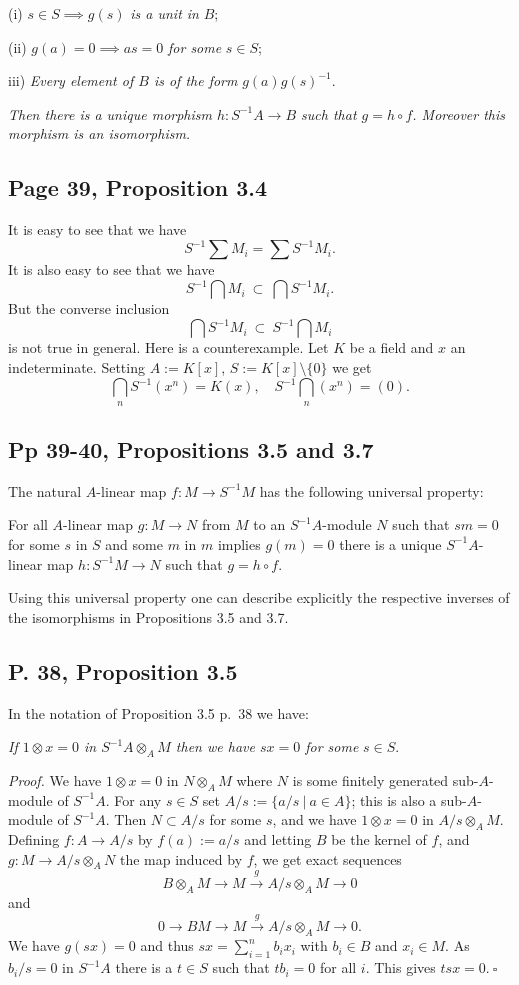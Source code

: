 \documentclass[parskip=half,fontsize=12pt]{scrartcl}%
\newcommand{\xr}{\xrightarrow}
\begin{document}
(i) $s\in S\implies g(s)$ \emph{is a unit in} $B$;

(ii) $g(a)=0\implies as=0$ \emph{for some} $s\in S$;

iii) \emph{Every element of $B$ is of the form} $g(a)g(s)^{-1}$.

\emph{Then there is a unique morphism $h:S^{-1}A\to B$ such that $g=h\circ f$. Moreover this morphism is an isomorphism.}

\subsection{Page 39, Proposition 3.4}%

It is easy to see that we have 
$$
S^{-1}\sum M_i=\sum S^{-1}M_i.
$$ 
It is also easy to see that we have 
$$
S^{-1}\bigcap M_i\ \subset\ \bigcap S^{-1}M_i.
$$ 
But the converse inclusion 
$$
\bigcap S^{-1}M_i\ \subset\ S^{-1}\bigcap M_i
$$ 
is not true in general. Here is a counterexample. Let $K$ be a field and $x$ an indeterminate. Setting $A:=K[x]$, $S:=K[x]\setminus\{0\}$ we get 
$$
\bigcap_n S^{-1}(x^n)=K(x),\quad S^{-1}\bigcap_n(x^n)=(0).
$$

\subsection{Pp 39-40, Propositions 3.5 and 3.7}%

The natural $A$-linear map $f:M\to S^{-1}M$ has the following universal property:

For all $A$-linear map $g:M\to N$ from $M$ to an $S^{-1}A$-module $N$ such that $sm=0$ for some $s$ in $S$ and some $m$ in $m$ implies $g(m)=0$ there is a unique $S^{-1}A$-linear map $h:S^{-1}M\to N$ such that $g=h\circ f$.

Using this universal property one can describe explicitly the respective inverses of the isomorphisms in Propositions 3.5 and 3.7.

\subsection{P. 38, Proposition 3.5}%

In the notation of Proposition 3.5 p.~38 we have:

\emph{If $1\otimes x=0$ in $S^{-1}A\otimes_AM$ then we have $sx=0$ for some} $s\in S$.

\emph{Proof.} We have $1\otimes x=0$ in $N\otimes_AM$ where $N$ is some finitely generated sub-$A$-module of $S^{-1}A$. For any $s\in S$ set $A/s:=\{a/s\ |\ a\in A\}$; this is also a sub-$A$-module of $S^{-1}A$. Then $N\subset A/s$ for some $s$, and we have $1\otimes x=0$ in $A/s\otimes_AM$. Defining $f:A\to A/s$ by $f(a):=a/s$ and letting $B$ be the kernel of $f$, and $g:M\to A/s\otimes_AN$ the map induced by $f$, we get exact sequences 
$$
B\otimes_AM\to M\xr gA/s\otimes_AM\to0
$$ 
and 
$$
0\to BM\to M\xr gA/s\otimes_AM\to0.
$$ 
We have $g(sx)=0$ and thus $sx=\sum_{i=1}^nb_ix_i$ with $b_i\in B$ and $x_i\in M$. As $b_i/s=0$ in $S^{-1}A$ there is a $t\in S$ such that $tb_i=0$ for all $i$. This gives $tsx=0.\ \square$
\end{document}
